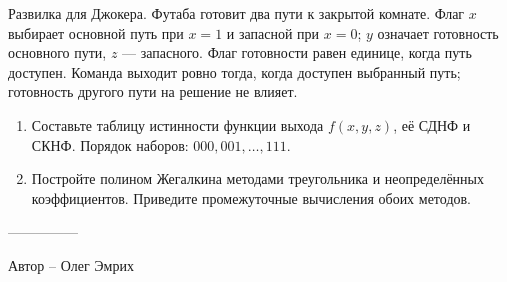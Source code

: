 \question
Развилка для Джокера. Футаба готовит два пути к закрытой комнате. Флаг $x$ выбирает основной путь при $x=1$ и запасной при $x=0$; $y$ означает готовность основного пути, $z$ --- запасного. Флаг готовности равен единице, когда путь доступен. Команда выходит ровно тогда, когда доступен выбранный путь; готовность другого пути на решение не влияет.
\begin{enumerate}
\item Составьте таблицу истинности функции выхода $f(x,y,z)$, её СДНФ и СКНФ. Порядок наборов: $000,001,\ldots,111$.
\item Постройте полином Жегалкина методами треугольника и неопределённых коэффициентов. Приведите промежуточные вычисления обоих методов.
\end{enumerate}

---------------

Автор -- Олег Эмрих
